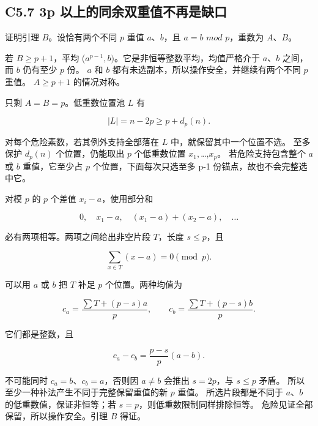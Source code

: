 \subsection*{\texorpdfstring{{C5.7} {3p} {以上的同余双重值不再是缺口}}{C5.7 3p 以上的同余双重值不再是缺口}}\label{C5-h33}

{证明引理} {\ensuremath{B}。设恰有两个不同} {\ensuremath{p}} {重值} {\ensuremath{a}、\ensuremath{b}，且} {\ensuremath{a=b}} {\ensuremath{mod}} {\ensuremath{p}，重数为} {\ensuremath{A}、\ensuremath{B}。}

{若} {\ensuremath{B\ge p+1}，平均} {(\ensuremath{a^{p-1},b)}。它是非恒等整数平均，均值严格介于} {\ensuremath{a}、\ensuremath{b}} {之间，而} {\ensuremath{b}} {仍有至少} {\ensuremath{p}} {份。} {\ensuremath{a}} {和} {\ensuremath{b}} {都有未选副本，所以操作安全，并继续有两个不同} {\ensuremath{p}} {重值。} {\ensuremath{A\ge p+1}} {的情况对称。}

{只剩} {\ensuremath{A=B=p}。低重数位置池} {\ensuremath{L}} {有}

\[
|L|=n-2p\ge p+d_p(n).
\]

{对每个危险素数，若其例外支持全部落在} {\ensuremath{L}} {中，就保留其中一个位置不选。} {至多保护} {\ensuremath{d_{p}(n)}} {个位置，仍能取出} {\ensuremath{p}} {个低重数位置} {\ensuremath{x_{1},}\ldots,\ensuremath{x_{p}}。} {若危险支持包含整个} {\ensuremath{a}} {或} {\ensuremath{b}} {重值，它至少占} {\ensuremath{p}} {个位置，下面每次只选至多} {p-1} {份锚点，故也不会完整选中它。}

{对模} {\ensuremath{p}} {的} {\ensuremath{p}} {个差值} {\ensuremath{x_{i}-a}，使用部分和}

\[
0,\quad x_1-a,\quad (x_1-a)+(x_2-a),\quad\ldots
\]

{必有两项相等。两项之间给出非空片段} {\ensuremath{T}，长度} {\ensuremath{s\le p}，且}

\[
\sum_{x\in T}(x-a)=0\pmod p.
\]

{可以用} {\ensuremath{a}} {或} {\ensuremath{b}} {把} {\ensuremath{T}} {补足} {\ensuremath{p}} {个位置。两种均值为}

\[
c_a=\frac{\sum T+(p-s)a}{p},\qquad
c_b=\frac{\sum T+(p-s)b}{p}.
\]

{它们都是整数，且}

\[
c_a-c_b=\frac{p-s}{p}(a-b).
\]

{不可能同时} {\ensuremath{c_{a}=b}、\ensuremath{c_{b}=a}，否则因} {\ensuremath{a\ne b}} {会推出} {\ensuremath{s=2p}，与} {\ensuremath{s\le p}} {矛盾。} {所以至少一种补法产生不同于完整保留重值的新} {\ensuremath{p}} {重值。} {所选片段都是不同于} {\ensuremath{a}、\ensuremath{b}} {的低重数值，保证非恒等；若} {\ensuremath{s=p}，则低重数限制同样排除恒等。} {危险见证全部保留，所以操作安全。引理} {\ensuremath{B}} {得证。}

